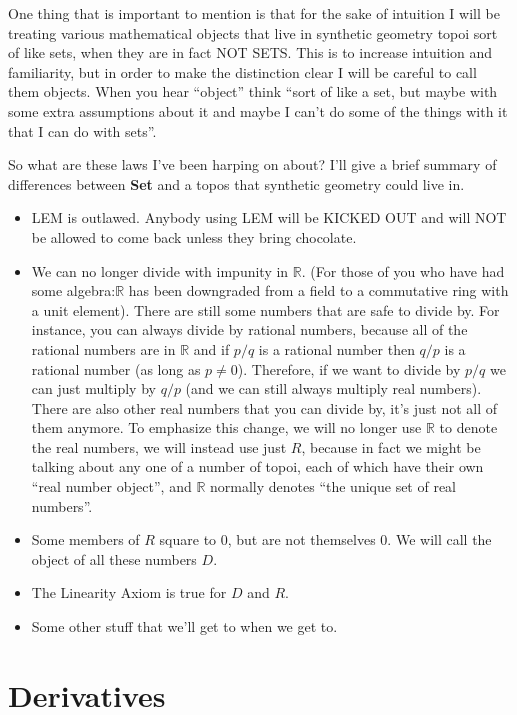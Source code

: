 \documentclass[]{book}
\begin{document}
One thing that is important to mention is that for the sake of intuition I will be treating various mathematical objects that live in synthetic geometry topoi sort of like sets, when they are in fact NOT SETS. This is to increase intuition and familiarity, but in order to make the distinction clear I will be careful to call them objects. When you hear ``object'' think ``sort of like a set, but maybe with some extra assumptions about it and maybe I can't do some of the things with it that I can do with sets''.

So what are these laws I've been harping on about? I'll give a brief summary of differences between \textbf{Set} and a topos that synthetic geometry could live in.

\begin{itemize}
\item
  LEM is outlawed. Anybody using LEM will be KICKED OUT and will NOT be allowed to come back unless they bring chocolate.
\item
  We can no longer divide with impunity in $\mathbb{R}$. (For those of you who have had some algebra:$\mathbb{R}$ has been downgraded from a field to a commutative ring with a unit element). There are still some numbers that are safe to divide by. For instance, you can always divide by rational numbers, because all of the rational numbers are in $\mathbb{R}$ and if $p/q$ is a rational number then $q/p$ is a rational number (as long as $p \neq 0$). Therefore, if we want to divide by $p/q$ we can just multiply by $q/p$ (and we can still always multiply real numbers). There are also other real numbers that you can divide by, it's just not all of them anymore. To emphasize this change, we will no longer use $\mathbb{R}$ to denote the real numbers, we will instead use just $R$, because in fact we might be talking about any one of a number of topoi, each of which have their own ``real number object'', and $\mathbb{R}$ normally denotes ``the unique set of real numbers''.
\item
  Some members of $R$ square to 0, but are not themselves 0. We will call the object of all these numbers $D$.
\item
  The Linearity Axiom is true for $D$ and $R$.
\item
  Some other stuff that we'll get to when we get to.
\end{itemize}

\chapter{Derivatives}
\end{document}
